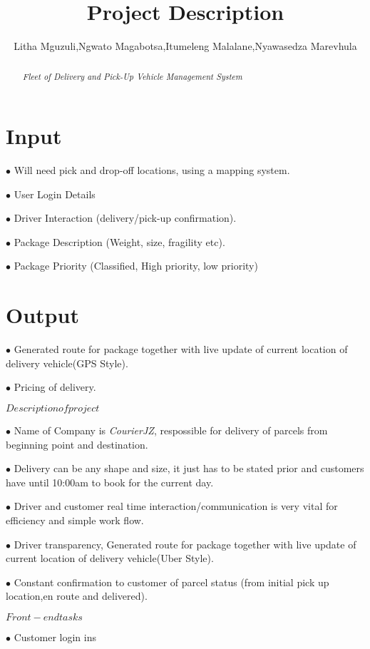 \documentclass[a4paper]{article}
\title{Project Description}
\author{Litha Mguzuli,Ngwato Magabotsa,Itumeleng Malalane,Nyawasedza Marevhula}
\begin{document}
\maketitle

\begin{abstract}
       \emph{Fleet of Delivery and Pick-Up Vehicle Management System}
\end{abstract}

\section{Input}

$\bullet$ Will need pick and drop-off locations, using a mapping system.

$\bullet$ User Login Details

$\bullet$ Driver Interaction (delivery/pick-up confirmation).

$\bullet$ Package Description (Weight, size, fragility etc).

$\bullet$ Package Priority (Classified, High priority, low priority)

\section{Output}

$\bullet$ Generated route for package together with live update of current
location of delivery vehicle(GPS Style).

$\bullet$ Pricing of delivery.

$Description of project$

$\bullet$ Name of Company is \emph{CourierJZ}, respossible for delivery of parcels from beginning point and destination.

$\bullet$ Delivery can be any shape and size, it just has to be stated prior and customers have until 10:00am to book for the current day.

$\bullet$ Driver and customer real time interaction/communication is very vital for efficiency and simple work flow.

$\bullet$ Driver transparency, Generated route for package together with live update of current location
of delivery vehicle(Uber Style).

$\bullet$ Constant confirmation to customer of parcel status (from initial pick up location,en route and delivered).


$Front-end tasks$

$\bullet$ Customer login ins
\end{document}
